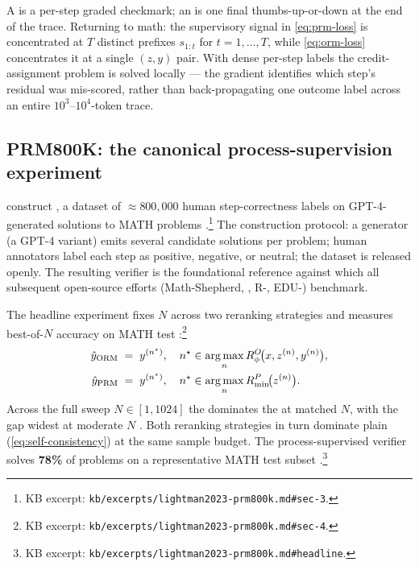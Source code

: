 \begin{intuition}
A  is a per-step graded checkmark; an  is one final
thumbs-up-or-down at the end of the trace. Returning to math: the
supervisory signal in \cref{eq:prm-loss} is concentrated at $T$
distinct prefixes $s_{1:t}$ for $t = 1, \ldots, T$, while
\cref{eq:orm-loss} concentrates it at a single $(z, y)$ pair. With
dense per-step labels the credit-assignment problem is solved
locally — the gradient identifies which step's residual was
mis-scored, rather than back-propagating one outcome label across an
entire $10^3$--$10^4$-token trace.
\end{intuition}

\subsection{PRM800K: the canonical process-supervision experiment}
\label{sec:prm-prm800k}

\citet{lightman2023-prm800k} construct \textbf{}, a dataset of
$\approx 800{,}000$ human step-correctness labels on GPT-4-generated
solutions to MATH problems \citep[\S 3]{lightman2023-prm800k}.\footnote{KB
excerpt: \texttt{kb/excerpts/lightman2023-prm800k.md\#sec-3}.} The
construction protocol: a generator (a GPT-4 variant) emits several
candidate solutions per problem; human annotators label each step as
positive, negative, or neutral; the dataset is released openly. The
resulting verifier is the foundational reference  against which all
subsequent open-source efforts (Math-Shepherd, , R-,
EDU-) benchmark.

The headline experiment fixes $N$ across two reranking strategies and
measures best-of-$N$ accuracy on MATH test
\citep[\S 4]{lightman2023-prm800k}:\footnote{KB excerpt:
\texttt{kb/excerpts/lightman2023-prm800k.md\#sec-4}.}
\begin{align}
  \hat y_\text{ORM} \;&=\; y^{(n^\star)}, \quad n^\star \in \operatorname*{arg\,max}_n R^O_\phi\!\bigl(x, z^{(n)}, y^{(n)}\bigr), \label{eq:bon-orm} \\
  \hat y_\text{PRM} \;&=\; y^{(n^\star)}, \quad n^\star \in \operatorname*{arg\,max}_n R^P_{\min}\!\bigl(z^{(n)}\bigr). \label{eq:bon-prm}
\end{align}
Across the full sweep $N \in [1, 1024]$ the  dominates the  at
matched $N$, with the gap widest at moderate $N$
\citep[Fig. 4]{lightman2023-prm800k}. Both reranking strategies in
turn dominate plain 
(\cref{eq:self-consistency}) at the same sample budget. The
process-supervised verifier solves \textbf{78\%} of problems on a
representative MATH test subset
\citep[abstract]{lightman2023-prm800k}.\footnote{KB excerpt:
\texttt{kb/excerpts/lightman2023-prm800k.md\#headline}.}

